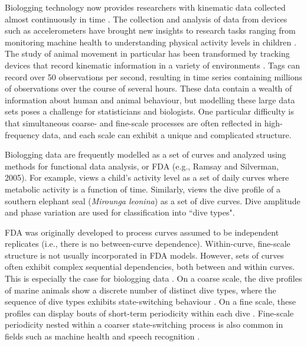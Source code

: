 
Biologging technology now provides researchers with kinematic data collected almost continuously in time \citep{Hooten:2017}.
The collection and analysis of data from devices such as accelerometers have brought new insights to research tasks ranging from monitoring machine health \citep{Getman:2009} to understanding physical activity levels in children \citep{Morris:2007}. The study of animal movement in particular has been transformed by tracking devices that record kinematic information in a variety of environments \citep{Dot:2016b,Borger:2020}. Tags can record over 50 observations per second, resulting in time series containing millions of observations over the course of several hours. 
These data contain a wealth of information about human and animal behaviour, but modelling these large data sets poses a challenge for statisticians and biologists. One particular difficulty is that simultaneous coarse- and fine-scale processes are often reflected in high-frequency data, and each scale can exhibit a unique and complicated structure.

Biologging data are frequently modelled as a set of curves and analyzed using methods for functional data analysis, or FDA \nocite{Ramsay:2005}(e.g., Ramsay and Silverman, 2005). For example, \citet{Morris:2007} views a child's activity level as a set of daily curves where metabolic activity is a function of time. Similarly, \citet{Fu:2017} views the dive profile of a southern elephant seal (\textit{Mirounga leonina}) as a set of dive curves. Dive amplitude and phase variation are used for classification into ``dive types".

FDA was originally developed to process curves assumed to be independent replicates (i.e., there is no between-curve dependence). Within-curve, fine-scale structure is not usually incorporated in FDA models. However, sets of curves often exhibit complex sequential dependencies, both between and within curves. This is especially the case for biologging data \citep{Barajas:2017}.
On a coarse scale, the dive profiles of marine animals show a discrete number of distinct dive types, where the sequence of dive types exhibits state-switching behaviour \citep{Tennessen:2019b}. On a fine scale, these profiles can display bouts of short-term periodicity within each dive \citep{Adam:2019}. Fine-scale periodicity nested within a coarser state-switching process is also common in fields such as machine health \citep{Xin:2018,Lucero:2019} and speech recognition \citep{Juang:1991}. 

